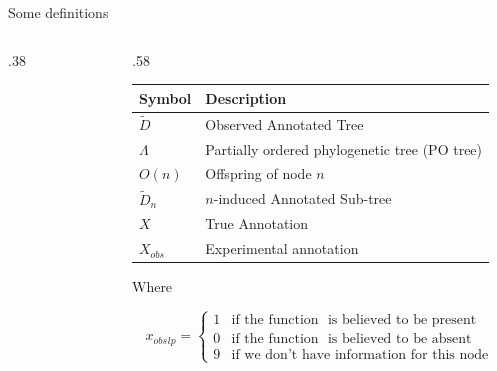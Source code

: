 \documentclass[9pt,ignorenonframetext,aspectratio=169]{beamer}
\newcommand{\includetikz}[2]{
\begin{figure}
\scalebox{#2}{

}
\end{figure}
}
\newcommand{\phylo}{\Lambda{}} %
\newcommand{\aphylo}{D{}}      %
\newcommand{\aphyloObs}{\tilde \aphylo{}} %
\newcommand{\Ann}{X{}} %
\newcommand{\AnnObs}{{X_{obs}}{}}%
\newcommand{\annObs}{{x_{obs}}{}}%
\def\begincols{\begin{columns}[T]}
\def\begincol{\begin{column}[T]}
\def\endcol{\end{column}}
\def\endcols{\end{columns}}
\begin{document}
\begin{frame}[t,label=definitions]{Some definitions}

\begincols

\begincol{.38\linewidth}

\includetikz{simple_tree_names.tex}{.5}

\endcol

\begincol{.58\linewidth}

\footnotesize

\begin{longtable}[]{@{}ll@{}}
\toprule
Symbol & Description\tabularnewline
\midrule
\endhead
\(\aphyloObs\) & Observed Annotated Tree\tabularnewline
\(\phylo\) & Partially ordered phylogenetic tree (PO
tree)\tabularnewline
\(O(n)\) & Offspring of node \(n\)\tabularnewline
\(\aphyloObs_n\) & \(n\)-induced Annotated Sub-tree\tabularnewline
\(\Ann\) & True Annotation\tabularnewline
\(\AnnObs\) & Experimental annotation\tabularnewline
\bottomrule
\end{longtable}

Where

\[
\annObs_{lp} = \left\{
\begin{array}{ll}
1 & \mbox{if the function }\mbox{ is believed to be present}\\
0 & \mbox{if the function }\mbox{ is believed to be absent}\\
9 & \mbox{if we don't have information for this node }
\end{array}\right.
\]

\normalsize

\hyperlink{formaldef}{}

\endcol

\endcols

\end{frame}
\end{document}
